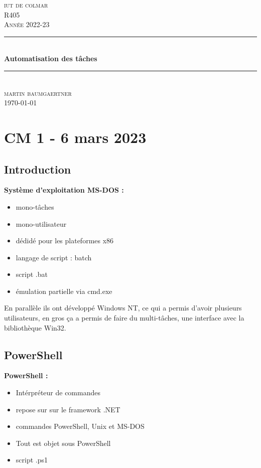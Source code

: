 \documentclass[12pt, a4paper]{article}
\begin{document}
\begin{titlepage}
	\newcommand{\HRule}{\rule{\linewidth}{0.5mm}} 
	\center 
	\textsc{\LARGE iut de colmar}\\[6.5cm] 
	\textsc{\Large R405}\\[0.5cm] 
	\textsc{\large Année 2022-23}\\[0.5cm]
	\HRule\\[0.75cm]
	{\huge\bfseries Automatisation des tâches}\\[0.4cm]
	\HRule\\[1.5cm]
	\textsc{\large martin baumgaertner}\\[6.5cm] 

	\vfill\vfill\vfill
	{\large\today} 
	\vfill
\end{titlepage}
\newpage
\tableofcontents
\newpage
\section{CM 1 - 6 mars 2023}
\subsection{Introduction}
\textbf{Système d'exploitation MS-DOS :}\\

    \begin{itemize}
        \item mono-tâches
        \item mono-utilisateur
        \item dédidé pour les plateformes x86
        \item langage de script : batch
        \item script .bat 
        \item émulation partielle via cmd.exe\\
    \end{itemize}

En parallèle ils ont développé Windows NT, ce qui a permis d'avoir plusieurs utilisateurs, 
en gros ça a permis de faire du multi-tâches, une interface avec la bibliothèque Win32.\\

\subsection{PowerShell}
\textbf{PowerShell :}\\

    \begin{itemize}
        \item Intérpréteur de commandes
        \item repose sur sur le framework .NET
        \item commandes PowerShell, Unix et MS-DOS
        \item Tout est objet sous PowerShell
        \item script .ps1\\
    \end{itemize}
\end{document}
